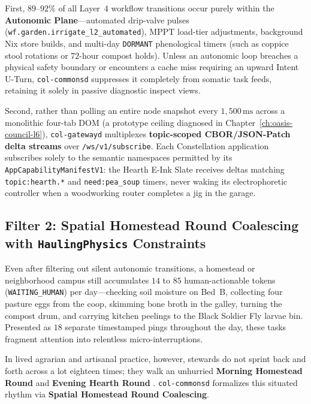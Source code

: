 First, $89\text{--}92\%$ of all Layer~4 workflow transitions occur purely within the \textbf{Autonomic Plane}---automated drip-valve pulses (\texttt{wf.garden.irrigate\_l2\_automated}), MPPT load-tier adjustments, background Nix store builds, and multi-day \texttt{DORMANT} phenological timers (such as coppice stool rotations or $72$-hour compost holds). Unless an autonomic loop breaches a physical safety boundary or encounters a cache miss requiring an upward Intent U-Turn, \texttt{col-commonsd} suppresses it completely from somatic task feeds, retaining it solely in passive diagnostic inspect views.

Second, rather than polling an entire node snapshot every $1{,}500\,\mathrm{ms}$ across a monolithic four-tab DOM (a prototype ceiling diagnosed in Chapter~\ref{ch:oasis-council-l6}), \texttt{col-gatewayd} multiplexes \textbf{topic-scoped CBOR/JSON-Patch delta streams} over \texttt{/ws/v1/subscribe}. Each Constellation application subscribes solely to the semantic namespaces permitted by its \texttt{AppCapabilityManifestV1}: the Hearth E-Ink Slate receives deltas matching \texttt{topic:hearth.*} and \texttt{need:pea\_soup} timers, never waking its electrophoretic controller when a woodworking router completes a jig in the garage.

\subsection{Filter 2: Spatial Homestead Round Coalescing with \texttt{HaulingPhysics} Constraints}

Even after filtering out silent autonomic transitions, a homestead or neighborhood campus still accumulates $14$ to $85$ human-actionable tokens (\texttt{WAITING\_HUMAN}) per day---checking soil moisture on Bed~B, collecting four pasture eggs from the coop, skimming bone broth in the galley, turning the compost drum, and carrying kitchen peelings to the Black Soldier Fly larvae bin. Presented as $18$ separate timestamped pings throughout the day, these tasks fragment attention into relentless micro-interruptions.

In lived agrarian and artisanal practice, however, stewards do not sprint back and forth across a lot eighteen times; they walk an unhurried \textbf{Morning Homestead Round} and \textbf{Evening Hearth Round} \parencite{hutchins1995cognition,suchman1987plans}. \texttt{col-commonsd} formalizes this situated rhythm via \textbf{Spatial Homestead Round Coalescing}.

